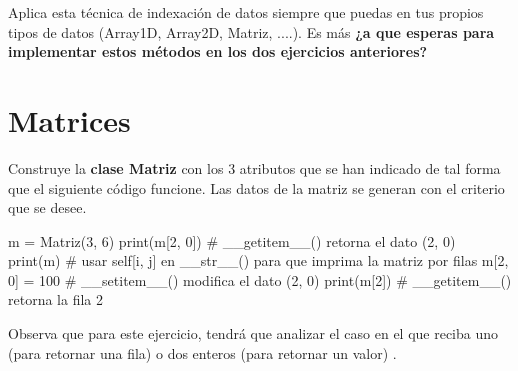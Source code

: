 Aplica esta técnica de indexación de datos siempre que puedas en tus propios tipos de datos (Array1D, Array2D, Matriz, ....). Es más \textbf{¿a que esperas para implementar estos métodos en los dos ejercicios anteriores? }






\separacion
\section{Matrices} \label{sec:MatrizDatosIndexados} 


Construye la \textbf{clase Matriz} con los 3 atributos que se han indicado de tal forma que el siguiente código funcione. Las datos de la matriz se generan con el criterio que se desee. 

\begin{pyverbatim}[][frame=single]
m = Matriz(3, 6)
print(m[2, 0])  # __getitem__() retorna el dato (2, 0)
print(m)        # usar self[i, j] en __str__() para que imprima la matriz por filas
m[2, 0] = 100   # __setitem__() modifica el dato (2, 0)
print(m[2])     # __getitem__() retorna la fila 2
\end{pyverbatim}

Observa que para este ejercicio,  tendrá que analizar el caso en el que reciba uno (para retornar una fila) o dos enteros (para retornar un valor) .

